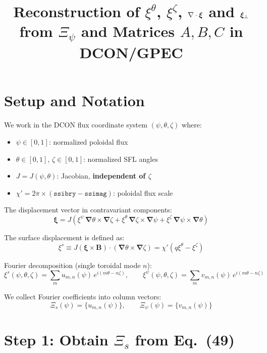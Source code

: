 \documentclass[12pt,a4paper]{article}
\title{\textbf{Reconstruction of $\xi^\theta$, $\xi^\zeta$, $\nabla\cdot\bxi$ and $\bxi_\perp$} \\ 
\large from $\Xi_\psi$ and Matrices $A, B, C$ in DCON/GPEC}
\author{}
\date{}
\newcommand{\bnabla}{\boldsymbol{\nabla}}
\newcommand{\bxi}{\boldsymbol{\xi}}
\begin{document}
\maketitle

\section*{Setup and Notation}

We work in the DCON flux coordinate system $(\psi, \theta, \zeta)$ where:
\begin{itemize}
    \item $\psi \in [0,1]$: normalized poloidal flux
    \item $\theta \in [0,1]$, $\zeta \in [0,1]$: normalized SFL angles
    \item $J = J(\psi, \theta)$: Jacobian, \textbf{independent of $\zeta$}
    \item $\chi' = 2\pi \times (\texttt{ssibry} - \texttt{ssimag})$: poloidal flux scale
\end{itemize}

The displacement vector in contravariant components:
\begin{equation}
    \bxi = J\!\left(\xi^\psi \,\bnabla\theta\times\bnabla\zeta 
    + \xi^\theta \,\bnabla\zeta\times\bnabla\psi 
    + \xi^\zeta \,\bnabla\psi\times\bnabla\theta\right)
\end{equation}

The surface displacement is defined as:
\begin{equation}
    \xi^s \equiv J\!\left(\bxi \times \mathbf{B}\right)\cdot\left(\bnabla\theta\times\bnabla\zeta\right) = \chi'(q\xi^\theta - \xi^\zeta)
    \label{eq:xis_def}
\end{equation}

Fourier decomposition (single toroidal mode $n$):
\begin{equation}
    \xi^s(\psi,\theta,\zeta) = \sum_m u_{m,n}(\psi)\,e^{i(m\theta - n\zeta)}, 
    \qquad
    \xi^\psi(\psi,\theta,\zeta) = \sum_m v_{m,n}(\psi)\,e^{i(m\theta - n\zeta)}
\end{equation}

We collect Fourier coefficients into column vectors:
\begin{equation}
    \Xi_s(\psi) = \{u_{m,n}(\psi)\}, \qquad \Xi_\psi(\psi) = \{v_{m,n}(\psi)\}
\end{equation}

\section{Step 1: Obtain $\Xi_s$ from Eq.~(49)}
\end{document}
